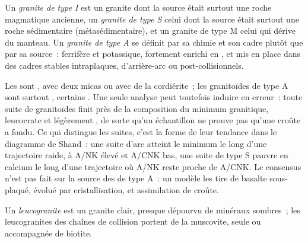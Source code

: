 \begin{definition}\label{def:b2:crustal-melting:types}
Un \emph{granite de type I} est un granite dont la source était surtout une roche magmatique
ancienne, un \emph{granite de type S} celui dont la source était surtout une roche sédimentaire
(métasédimentaire), et un granite de type M celui qui dérive du manteau.
Un \emph{granite de type A} se définit par sa chimie et son cadre plutôt que par sa source~: ferrifère et potassique,
fortement enrichi en , et mis en place dans des cadres stables intraplaques,
d'arrière-arc ou post-collisionnels.
\end{definition}

Les  sont , avec deux micas ou avec de la cordiérite~; les granitoïdes
de type A sont surtout , certains . Une seule analyse peut toutefois induire
en erreur~: toute suite de granitoïdes finit près de la composition du minimum granitique,
leucocrate et légèrement , de sorte qu'un échantillon  ne prouve pas
qu'une croûte a fondu. Ce qui distingue les suites, c'est la forme de leur tendance dans le diagramme
de Shand~: une suite d'arc atteint le minimum le long d'une trajectoire raide, à A/NK élevé et A/CNK bas,
une suite de type S pauvre en calcium le long d'une trajectoire où A/NK reste proche de A/CNK. Le consensus
n'est pas fait sur la source des  de type A~: un modèle les tire de basalte sous-plaqué, évolué
par cristallisation,  et assimilation de croûte.

\begin{definition}[Leucogranite]\label{def:b2:crustal-melting:leucogranite}
Un \emph{leucogranite} est un granite clair, presque dépourvu de
minéraux sombres~; les leucogranites  des chaînes de collision portent de la muscovite, seule ou
accompagnée de biotite.
\end{definition}

